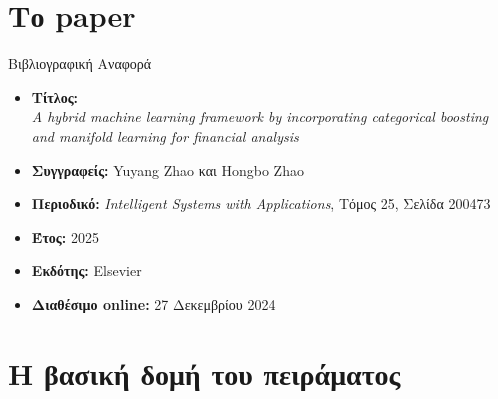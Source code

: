 \documentclass{beamer}
\newcommand{\tl}[1]{\textlatin{#1}}
\newcommand{\place}[1]{images/#1.png}
\begin{document}
\section{Το \tl{paper}}
\begin{frame}{Βιβλιογραφική Αναφορά}
\small
\begin{itemize}
  \item \textbf{Τίτλος:} \\
  \textit{\tl{A hybrid machine learning framework by incorporating categorical boosting and manifold learning for financial analysis}}

  \item \textbf{Συγγραφείς:} \tl{Yuyang Zhao} και \tl{Hongbo Zhao}

  \item \textbf{Περιοδικό:} \textit{\tl{Intelligent Systems with Applications}}, Τόμος 25, Σελίδα 200473

  \item \textbf{Έτος:} 2025

  \item \textbf{Εκδότης:} \tl{Elsevier}

  \item \textbf{Διαθέσιμο \tl{online}:} 27 Δεκεμβρίου 2024

\end{itemize}
\end{frame}

\section{Η βασική δομή του πειράματος}
\begin{frame}
\begin{figure}[H]
\centering
\texttt{[image: \\place\{graph2]}}
\caption{Η γενική μορφή της ακολουθίας μάθησης}
\end{figure}
\end{frame}
\end{document}
